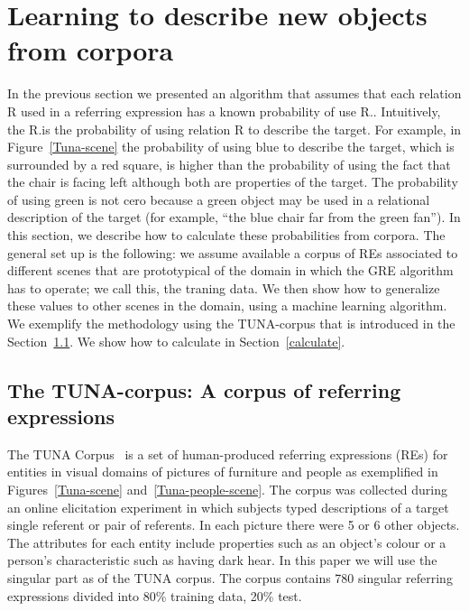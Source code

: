 \section{Learning to describe new objects from corpora}
\label{sec:learning}

In the previous section we presented an algorithm that assumes that each relation R 
used in a referring expression has a known probability of use R.\puse. 
Intuitively, the R.\puse is the probability of using relation R to describe the target. For example, in Figure~\ref{Tuna-scene} the probability of using blue to describe the target, which is surrounded by a red square, is higher than the probability of using the fact that the chair is facing left although both are properties of the target. The probability of using green is not cero because a green object may be used in a relational description of the target (for example, ``the blue chair far from the green fan''). In this section, 
we describe how to calculate these probabilities from corpora.  
The general set up is the following: we assume available a corpus of REs associated 
to different scenes that are prototypical of the domain in which the GRE algorithm has to operate; we call this, the traning data.   
We then show how to generalize these values to other scenes in the domain, using a machine learning algorithm. We exemplify the methodology using the TUNA-corpus that is introduced in the Section~\ref{sec:tuna}. We show how to calculate \puse in Section~\ref{calculate}. 

\subsection{The TUNA-corpus: A corpus of referring expressions}
\label{sec:tuna}
The TUNA Corpus~\cite{Gatt:2008:TCO:1708322.1708365} is a set of human-produced referring expressions (REs) for entities in visual domains of pictures of furniture and people as exemplified in Figures~\ref{Tuna-scene} and~\ref{Tuna-people-scene}. The corpus was
collected during an online elicitation experiment in which subjects typed descriptions of a target single referent or pair of referents. 
In each picture there were 5 or 6 other objects. 
The attributes for each entity include properties such as an object's colour or a person's characteristic such as having dark hear.
In this paper we will use the singular part as of the TUNA corpus. The corpus contains 780 singular referring expressions divided
into 80\% training data, 20\% test. 

